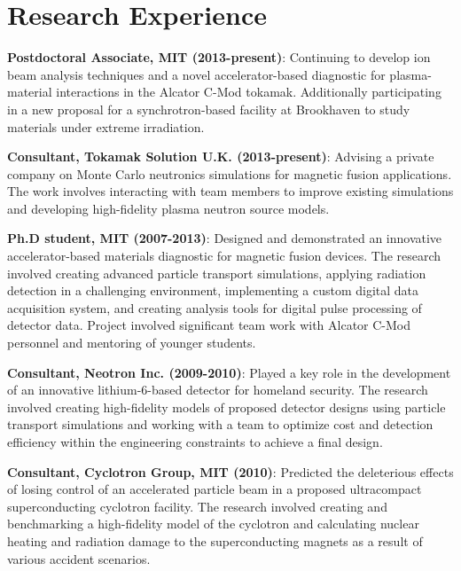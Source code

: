 \documentclass[10pt]{article}
\begin{document}
\section{Research Experience}
\begin{innerlist}
\item \textbf{Postdoctoral Associate, MIT (2013-present)}: Continuing
  to develop ion beam analysis techniques and a novel
  accelerator-based diagnostic for plasma-material interactions in the
  Alcator C-Mod tokamak. Additionally participating in a new proposal
  for a synchrotron-based facility at Brookhaven to study materials
  under extreme irradiation.\vspace{0.2cm}

\item \textbf{Consultant, Tokamak Solution U.K. (2013-present)}:
  Advising a private company on Monte Carlo neutronics simulations for
  magnetic fusion applications. The work involves interacting with
  team members to improve existing simulations and developing
  high-fidelity plasma neutron source models.\vspace{0.2cm}

\item \textbf{Ph.D student, MIT (2007-2013)}: Designed and
  demonstrated an innovative accelerator-based materials diagnostic
  for magnetic fusion devices. The research involved creating advanced
  particle transport simulations, applying radiation detection in a
  challenging environment, implementing a custom digital data
  acquisition system, and creating analysis tools for digital pulse
  processing of detector data. Project involved significant team work
  with Alcator C-Mod personnel and mentoring of younger
  students.\vspace{0.2cm}

\item \textbf{Consultant, Neotron Inc. (2009-2010)}: Played a key role
  in the development of an innovative lithium-6-based detector for
  homeland security. The research involved creating high-fidelity
  models of proposed detector designs using particle transport
  simulations and working with a team to optimize cost and detection
  efficiency within the engineering constraints to achieve a final
  design.\vspace{0.2cm}
  
\item \textbf{Consultant, Cyclotron Group, MIT (2010)}: Predicted the
  deleterious effects of losing control of an accelerated particle
  beam in a proposed ultracompact superconducting cyclotron
  facility. The research involved creating and benchmarking a
  high-fidelity model of the cyclotron and calculating nuclear heating
  and radiation damage to the superconducting magnets as a result of
  various accident scenarios.\vspace{0.2cm}


\end{innerlist}
\end{document}
